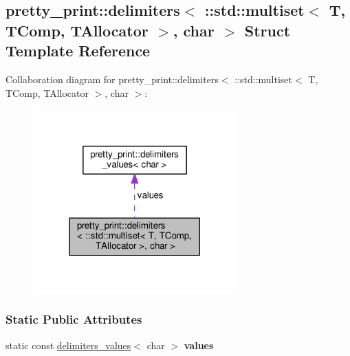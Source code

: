 \hypertarget{structpretty__print_1_1delimiters_3_01_1_1std_1_1multiset_3_01T_00_01TComp_00_01TAllocator_01_4_00_01char_01_4}{}\subsection{pretty\+\_\+print\+:\+:delimiters$<$ \+:\+:std\+:\+:multiset$<$ T, T\+Comp, T\+Allocator $>$, char $>$ Struct Template Reference}
\label{structpretty__print_1_1delimiters_3_01_1_1std_1_1multiset_3_01T_00_01TComp_00_01TAllocator_01_4_00_01char_01_4}


Collaboration diagram for pretty\+\_\+print\+:\+:delimiters$<$ \+:\+:std\+:\+:multiset$<$ T, T\+Comp, T\+Allocator $>$, char $>$\+:\nopagebreak
\begin{figure}[H]
\begin{center}
\leavevmode
\includegraphics[width=222pt]{structpretty__print_1_1delimiters_3_01_1_1std_1_1multiset_3_01T_00_01TComp_00_01TAllocator_01_4_00_01char_01_4__coll__graph}
\end{center}
\end{figure}
\subsubsection*{Static Public Attributes}
\begin{DoxyCompactItemize}
\item 
static const \hyperlink{structpretty__print_1_1delimiters__values}{delimiters\+\_\+values}$<$ char $>$ {\bfseries values}\hypertarget{structpretty__print_1_1delimiters_3_01_1_1std_1_1multiset_3_01T_00_01TComp_00_01TAllocator_01_4_00_01char_01_4_a1519f24d4d3b7d4e0eeb73316c79bf35}{}\label{structpretty__print_1_1delimiters_3_01_1_1std_1_1multiset_3_01T_00_01TComp_00_01TAllocator_01_4_00_01char_01_4_a1519f24d4d3b7d4e0eeb73316c79bf35}

\end{DoxyCompactItemize}


